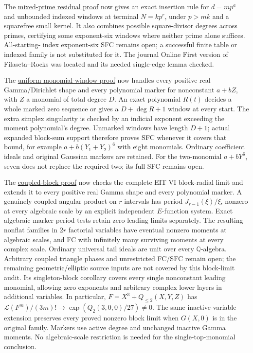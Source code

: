 \documentclass[11pt]{article}
\newcommand{\Q}{\mathbb Q}
\begin{document}
The \href{MIXED_PRIME_RESIDUAL_WINDOWS.tex}{mixed-prime residual proof}
now gives an exact insertion rule for $d=mp^a$ and unbounded indexed
windows at terminal $N=kp^r$, under $p>mk$ and a squarefree small kernel.
It also combines possible square-divisor degrees across primes, certifying
some exponent-six windows where neither prime alone suffices. All-starting-
index exponent-six SFC remains open; a successful finite table or indexed
family is not substituted for it. The journal Online First version of
Filaseta--Rocks was located and its needed single-edge lemma checked.

The \href{HYPERGEOMETRIC_MONOMIAL_WINDOWS.tex}{uniform monomial-window proof}
now handles every positive real Gamma/Dirichlet shape and every polynomial
marker for nonconstant $a+bZ$, with $Z$ a monomial of total degree $D$.
An exact polynomial $R(t)$ decides a whole marked zero sequence or gives
a $D+\deg R+1$ window at every start. The extra simplex singularity is
checked by an indicial exponent exceeding the moment polynomial's degree.
Unmarked windows have length $D+1$; actual expanded block-sum support
therefore proves SFC whenever it covers that bound, for example
$a+b(Y_1+Y_2)^6$ with eight monomials. Ordinary coefficient ideals and
original Gaussian markers are retained. For the two-monomial $a+bY^6$,
seven does not replace the required two; its full SFC remains open.

The \href{COUPLED_BLOCK_PERIODS.tex}{coupled-block proof} now checks the
complete EIT VI block-radial limit and extends it to every positive real
Gamma shape and every polynomial marker. A genuinely coupled angular
product on $r$ intervals has period $J_{r-1}(\xi)/\xi$, nonzero at every
algebraic scale by an explicit independent $E$-function system. Exact
algebraic-marker period tests retain zero leading limits separately.
The resulting nonflat families in $2r$ factorial variables have eventual
nonzero moments at algebraic scales, and FC with infinitely many surviving
moments at every complex scale. Ordinary universal tail ideals are unit
over every $\Q$-algebra. Arbitrary coupled triangle phases and unrestricted
FC/SFC remain open; the remaining geometric/elliptic source inputs are
not covered by this block-limit audit.
Its singleton-block corollary covers every single nonconstant leading
monomial, allowing zero exponents and arbitrary complex lower layers in
additional variables. In particular,
$F=X^3+Q_{\leq2}(X,Y,Z)$ has
$\mathcal L(F^m)/(3m)!\to\exp(Q_2(3,0,0)/27)\ne0$.
The same inactive-variable extension preserves every proved nonzero
block limit when $G(X,0)$ is in the original family. Markers use active
degree and unchanged inactive Gamma moments. No algebraic-scale
restriction is needed for the single-top-monomial conclusion.
\end{document}
